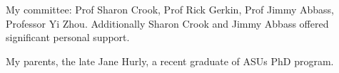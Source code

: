 
My committee: Prof Sharon Crook, Prof  Rick Gerkin, Prof Jimmy Abbass, Professor Yi Zhou. Additionally Sharon Crook and Jimmy Abbass offered significant personal support. 

My parents, the late Jane Hurly, a recent graduate of ASUs PhD program.